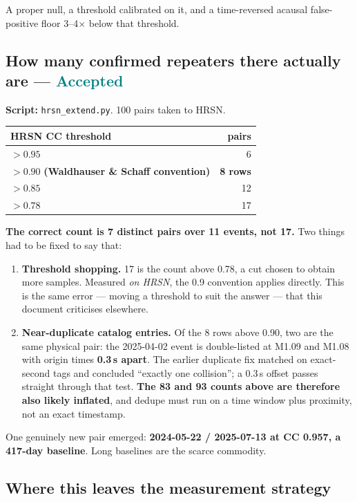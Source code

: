 \documentclass[11pt]{article}
\newcommand{\accepted}{\textcolor{teal}{\textbf{Accepted}}}
\begin{document}
A proper null, a threshold calibrated on it, and a time-reversed acausal
false-positive floor 3--4$\times$ below that threshold.

\subsection{How many confirmed repeaters there actually are --- \accepted}

\textbf{Script:} \texttt{hrsn\_extend.py}. 100 pairs taken to HRSN.

\begin{table}[H]
\centering
\begin{tabular}{lr}
\toprule
HRSN CC threshold & pairs \\
\midrule
$>0.95$ & 6 \\
$\mathbf{>0.90}$ \textbf{(Waldhauser \& Schaff convention)} & \textbf{8 rows} \\
$>0.85$ & 12 \\
$>0.78$ & 17 \\
\bottomrule
\end{tabular}
\end{table}

\textbf{The correct count is 7 distinct pairs over 11 events, not 17.} Two things
had to be fixed to say that:

\begin{enumerate}
  \item \textbf{Threshold shopping.} 17 is the count above 0.78, a cut chosen to
  obtain more samples. Measured \emph{on HRSN}, the 0.9 convention applies
  directly. This is the same error --- moving a threshold to suit the answer ---
  that this document criticises elsewhere.
  \item \textbf{Near-duplicate catalog entries.} Of the 8 rows above 0.90, two are
  the same physical pair: the 2025-04-02 event is double-listed at M1.09 and M1.08
  with origin times \textbf{0.3\,s apart}. The earlier duplicate fix matched on
  exact-second tags and concluded ``exactly one collision''; a 0.3\,s offset passes
  straight through that test. \textbf{The 83 and 93 counts above are therefore also
  likely inflated}, and dedupe must run on a time window plus proximity, not an
  exact timestamp.
\end{enumerate}

One genuinely new pair emerged: \textbf{2024-05-22 / 2025-07-13 at CC 0.957, a
417-day baseline}. Long baselines are the scarce commodity.

\subsection{Where this leaves the measurement strategy}
\end{document}
